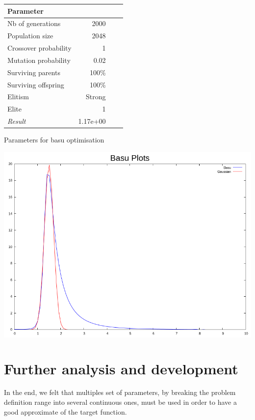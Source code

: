 \documentclass{article}
\begin{document}
    \begin{small} 
    \begin{tabular}{lrrr}
      Parameter &  \\
      \hline
      Nb of generations & 2000 \\
      Population size & 2048  \\
      Crossover probability & 1 \\
      Mutation probability & 0.02\\
      Surviving parents & 100\%  \\
      Surviving offspring& 100\% \\
      Elitism & Strong \\
      Elite & 1 \\ \hline
      \emph{Result} & 1.17e+00 \\
      \hline 
      \end{tabular}
      \caption{Parameters for basu optimisation}

      \includegraphics[scale=0.3]{basu_best}
    \end{small}

   \section{Further analysis and development} %
   \label{sec:section name}
   \paragraph{} %
   \label{par:}
   
     In the end, we felt that multiples set of parameters, by breaking the problem
     definition range into several continuous ones, must be used in order to have
     a good approximate of the target function.

  
\end{document}
